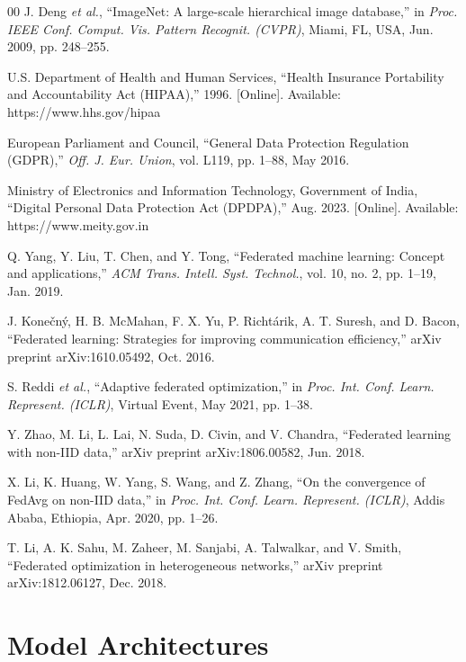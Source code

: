 \documentclass[conference]{IEEEtran}
\begin{document}
\begin{thebibliography}{00}
 J. Deng \textit{et al.}, ``ImageNet: A large-scale hierarchical image database,'' in \textit{Proc. IEEE Conf. Comput. Vis. Pattern Recognit. (CVPR)}, Miami, FL, USA, Jun. 2009, pp. 248--255.

 U.S. Department of Health and Human Services, ``Health Insurance Portability and Accountability Act (HIPAA),'' 1996. [Online]. Available: https://www.hhs.gov/hipaa

 European Parliament and Council, ``General Data Protection Regulation (GDPR),'' \textit{Off. J. Eur. Union}, vol. L119, pp. 1--88, May 2016.

 Ministry of Electronics and Information Technology, Government of India, ``Digital Personal Data Protection Act (DPDPA),'' Aug. 2023. [Online]. Available: https://www.meity.gov.in

 Q. Yang, Y. Liu, T. Chen, and Y. Tong, ``Federated machine learning: Concept and applications,'' \textit{ACM Trans. Intell. Syst. Technol.}, vol. 10, no. 2, pp. 1--19, Jan. 2019.

 J. Konečný, H. B. McMahan, F. X. Yu, P. Richtárik, A. T. Suresh, and D. Bacon, ``Federated learning: Strategies for improving communication efficiency,'' arXiv preprint arXiv:1610.05492, Oct. 2016.

 S. Reddi \textit{et al.}, ``Adaptive federated optimization,'' in \textit{Proc. Int. Conf. Learn. Represent. (ICLR)}, Virtual Event, May 2021, pp. 1--38.

 Y. Zhao, M. Li, L. Lai, N. Suda, D. Civin, and V. Chandra, ``Federated learning with non-IID data,'' arXiv preprint arXiv:1806.00582, Jun. 2018.

 X. Li, K. Huang, W. Yang, S. Wang, and Z. Zhang, ``On the convergence of FedAvg on non-IID data,'' in \textit{Proc. Int. Conf. Learn. Represent. (ICLR)}, Addis Ababa, Ethiopia, Apr. 2020, pp. 1--26.

 T. Li, A. K. Sahu, M. Zaheer, M. Sanjabi, A. Talwalkar, and V. Smith, ``Federated optimization in heterogeneous networks,'' arXiv preprint arXiv:1812.06127, Dec. 2018.
\end{thebibliography}

\appendices

\section{Model Architectures}
\end{document}

